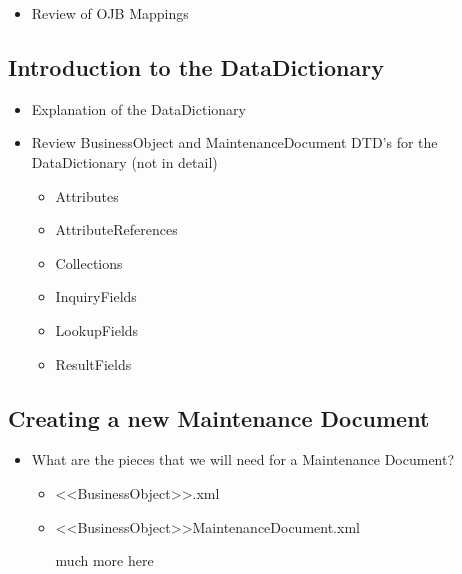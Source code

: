 \documentclass[12pt,notitlepage]{article}
\begin{document}
\begin{s5presentation}
\begin{s5slide}
\begin{ifhtml}
\begin{itemize}
              \item Review of OJB Mappings
          \end{itemize}
      \end{ifhtml} 
  \W \end{s5slide}
  \W \begin{s5slide}
      \W \section{Introduction to the DataDictionary}
      \begin{ifhtml}
          \begin{itemize}
              \item Explanation of the DataDictionary
              \item Review BusinessObject and MaintenanceDocument DTD's for the DataDictionary (not in detail)
              \begin{itemize}
                  \item Attributes
                  \item AttributeReferences
                  \item Collections
                  \item InquiryFields
                  \item LookupFields
                  \item ResultFields
              \end{itemize}
          \end{itemize}
      \end{ifhtml} 
  \W \end{s5slide}
  \W \begin{s5slide}
      \W \section{Creating a new Maintenance Document}
      \begin{ifhtml}
          \begin{itemize}
              \item What are the pieces that we will need for a Maintenance Document?
              \begin{itemize}
                  \item <<BusinessObject>>.xml 
                  \item <<BusinessObject>>MaintenanceDocument.xml
                  \item [much more here]
              \end{itemize}

\end{itemize}
\end{ifhtml}
\end{s5slide}
\end{s5presentation}
\end{document}
